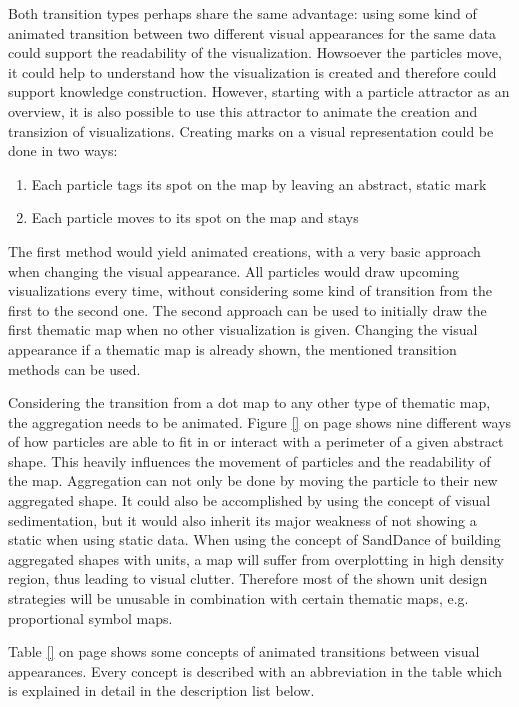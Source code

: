 Both transition types perhaps share the same advantage: using some kind of animated transition between two different visual appearances for the same data could support the readability of the visualization. Howsoever the particles move, it could help to understand how the visualization is created and therefore could support knowledge construction.
However, starting with a particle attractor as an overview, it is also possible to use this attractor to animate the creation and transizion of visualizations. Creating marks on a visual representation could be done in two ways:

\begin{enumerate}
\item Each particle tags its spot on the map by leaving an abstract, static mark
\item Each particle moves to its spot on the map and stays
\end{enumerate}

The first method would yield animated creations, with a very basic approach when changing the visual appearance. All particles would draw upcoming visualizations every time, without considering some kind of transition from the first to the second one. The second approach can be used to initially draw the first thematic map when no other visualization is given. Changing the visual appearance if a thematic map is already shown, the mentioned transition methods can be used.

Considering the transition from a dot map to any other type of thematic map, the aggregation needs to be animated. Figure \ref{} on page \pageref{} shows nine different ways of how particles are able to fit in or interact with a perimeter of a given abstract shape. This heavily influences the movement of particles and the readability of the map. Aggregation can not only be done by moving the particle to their new aggregated shape. It could also be accomplished by using the concept of visual sedimentation, but it would also inherit its major weakness of not showing a static when using static data. When using the concept of SandDance of building aggregated shapes with units, a map will suffer from overplotting in high density region, thus leading to visual clutter. Therefore most of the shown unit design strategies will be unusable in combination with certain thematic maps, e.g. proportional symbol maps.

Table \ref{} on page \pageref{} shows some concepts of animated transitions between visual appearances. Every concept is described with an abbreviation in the table which is explained in detail in the description list below.

